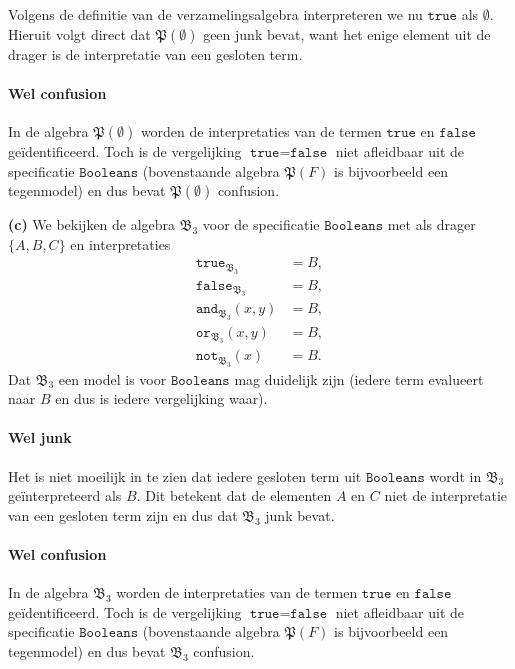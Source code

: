 \documentclass[a4paper,11pt]{article}
\begin{document}
\begin{description}
Volgens de definitie van de verzamelingsalgebra interpreteren we nu
$\texttt{true}$ als $\emptyset$. Hieruit volgt direct dat $\mathfrak{P}(\emptyset)$ geen
junk bevat, want het enige element uit de drager is de interpretatie van een
gesloten term.

\paragraph{Wel confusion}

In de algebra $\mathfrak{P}(\emptyset)$ worden de interpretaties van de termen
$\texttt{true}$ en $\texttt{false}$ ge\"identificeerd. Toch is de vergelijking
$\texttt{true} = \texttt{false}$ niet afleidbaar uit de specificatie
$\texttt{Booleans}$ (bovenstaande algebra $\mathfrak{P}(F)$ is bijvoorbeeld
een tegenmodel) en dus bevat $\mathfrak{P}(\emptyset)$ confusion.

\item{\bf (c)} %
We bekijken de algebra $\mathfrak{B}_{3}$ voor de specificatie
$\texttt{Booleans}$ met als drager $\{A,B,C\}$ en interpretaties
\begin{align*}
\texttt{true}_{\mathfrak{B}_{3}}     &= B, \\
\texttt{false}_{\mathfrak{B}_{3}}    &= B, \\
\texttt{and}_{\mathfrak{B}_{3}}(x,y) &= B, \\
\texttt{or}_{\mathfrak{B}_{3}}(x,y)  &= B, \\
\texttt{not}_{\mathfrak{B}_{3}}(x)   &= B.
\end{align*}
Dat $\mathfrak{B}_{3}$ een model is voor $\texttt{Booleans}$ mag duidelijk
zijn (iedere term evalueert naar $B$ en dus is iedere vergelijking waar).

\paragraph{Wel junk}

Het is niet moeilijk in te zien dat iedere gesloten term uit
$\texttt{Booleans}$ wordt in $\mathfrak{B}_{3}$ ge\"interpreteerd als $B$. Dit
betekent dat de elementen $A$ en $C$ niet de interpretatie van een gesloten
term zijn en dus dat $\mathfrak{B}_{3}$ junk bevat.

\paragraph{Wel confusion}

In de algebra $\mathfrak{B}_{3}$ worden de interpretaties van de termen
$\texttt{true}$ en $\texttt{false}$ ge\"identificeerd. Toch is de vergelijking
$\texttt{true} = \texttt{false}$ niet afleidbaar uit de specificatie
$\texttt{Booleans}$ (bovenstaande algebra $\mathfrak{P}(F)$ is bijvoorbeeld
een tegenmodel) en dus bevat $\mathfrak{B}_{3}$ confusion.

\end{description}
\end{document}
